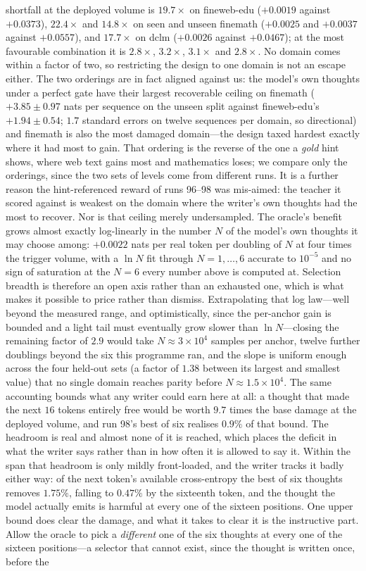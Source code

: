 \documentclass{article} %
\begin{document}
shortfall at the deployed volume is $19.7\times$ on fineweb-edu ($+0.0019$ against $+0.0373$), $22.4\times$ and $14.8\times$ on seen and unseen finemath ($+0.0025$ and $+0.0037$ against $+0.0557$), and $17.7\times$ on dclm ($+0.0026$ against $+0.0467$); at the most favourable combination it is $2.8\times$, $3.2\times$, $3.1\times$ and $2.8\times$. No domain comes within a factor of two, so restricting the design to one domain is not an escape either. The two orderings are in fact aligned against us: the model's own thoughts under a perfect gate have their largest recoverable ceiling on finemath ($+3.85 \pm 0.97$ nats per sequence on the unseen split against fineweb-edu's $+1.94 \pm 0.54$; $1.7$ standard errors on twelve sequences per domain, so directional) and finemath is also the most damaged domain---the design taxed hardest exactly where it had most to gain. That ordering is the reverse of the one a \emph{gold} hint shows, where web text gains most and mathematics loses; we compare only the orderings, since the two sets of levels come from different runs. It is a further reason the hint-referenced reward of runs 96--98 was mis-aimed: the teacher it scored against is weakest on the domain where the writer's own thoughts had the most to recover. Nor is that ceiling merely undersampled. The oracle's benefit grows almost exactly log-linearly in the number $N$ of the model's own thoughts it may choose among: $+0.0022$ nats per real token per doubling of $N$ at four times the trigger volume, with a $\ln N$ fit through $N = 1,\dots,6$ accurate to $10^{-5}$ and no sign of saturation at the $N = 6$ every number above is computed at. Selection breadth is therefore an open axis rather than an exhausted one, which is what makes it possible to price rather than dismiss. Extrapolating that log law---well beyond the measured range, and optimistically, since the per-anchor gain is bounded and a light tail must eventually grow slower than $\ln N$---closing the remaining factor of $2.9$ would take $N \approx 3 \times 10^{4}$ samples per anchor, twelve further doublings beyond the six this programme ran, and the slope is uniform enough across the four held-out sets (a factor of $1.38$ between its largest and smallest value) that no single domain reaches parity before $N \approx 1.5 \times 10^{4}$. The same accounting bounds what any writer could earn here at all: a thought that made the next $16$ tokens entirely free would be worth $9.7$ times the base damage at the deployed volume, and run 98's best of six realises $0.9\%$ of that bound. The headroom is real and almost none of it is reached, which places the deficit in what the writer says rather than in how often it is allowed to say it. Within the span that headroom is only mildly front-loaded, and the writer tracks it badly either way: of the next token's available cross-entropy the best of six thoughts removes $1.75\%$, falling to $0.47\%$ by the sixteenth token, and the thought the model actually emits is harmful at every one of the sixteen positions. One upper bound does clear the damage, and what it takes to clear it is the instructive part. Allow the oracle to pick a \emph{different} one of the six thoughts at every one of the sixteen positions---a selector that cannot exist, since the thought is written once, before the 
\end{document}

